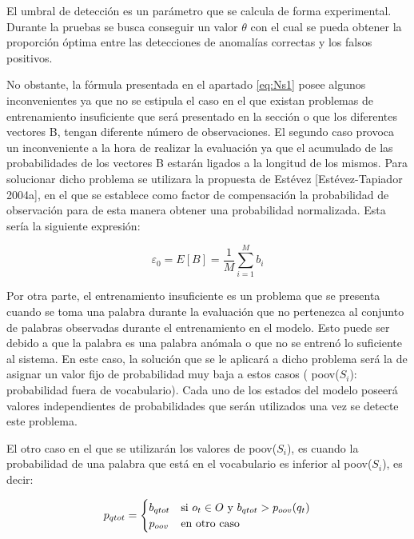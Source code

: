 El umbral de detección es un parámetro que se calcula de forma experimental. Durante la pruebas se busca conseguir un valor $\theta$ con el cual se pueda obtener la proporción óptima entre las detecciones de anomalías correctas y los falsos positivos. 

No obstante, la fórmula presentada en el apartado \ref{eq:Ns1} posee algunos inconvenientes ya que no se estipula el caso en el que existan problemas de entrenamiento insuficiente que será presentado en la sección o que los diferentes vectores B, tengan diferente número de observaciones. El segundo caso provoca un inconveniente a la hora de realizar la evaluación ya que el acumulado de las probabilidades de los vectores B estarán ligados a la longitud de los mismos. Para solucionar dicho problema se utilizara la propuesta de Estévez [Estévez-Tapiador 2004a], en el que se establece como factor de compensación la probabilidad de observación para de esta manera obtener una probabilidad normalizada. Esta sería la siguiente expresión:

\begin{equation}\label{eq:sumB}
\varepsilon_{0} = E[B] = \frac{1}{M}\sum_{i=1}^{M}b_{i}
\end{equation}

Por otra parte, el entrenamiento insuficiente es un problema que se presenta cuando se toma una palabra durante la evaluación que no pertenezca al conjunto de palabras observadas durante el entrenamiento en el modelo. Esto puede ser debido a que la palabra es una palabra anómala o que no se entrenó lo suficiente al sistema. En este caso, la solución que se le aplicará a dicho problema será la de asignar un valor fijo de probabilidad muy baja a estos casos ( poov($S_{i}$): probabilidad fuera de vocabulario). Cada uno de los estados del modelo poseerá valores independientes de probabilidades que serán utilizados una vez se detecte este problema.

El otro caso en el que se utilizarán los valores de poov($S_{i}$), es cuando la probabilidad de una palabra que está en el vocabulario es inferior al poov($S_{i}$), es decir:


\begin{equation}\label{eq:Pqtot}
p_{qtot} = 
	\begin{cases} 
      b_{qtot} & $si $  o_{t} \in O $ y $ b_{qtot} > p_{oov}(q_{t})\\
      p_{oov} & $en otro caso$ \\ 
   \end{cases}
\end{equation}



